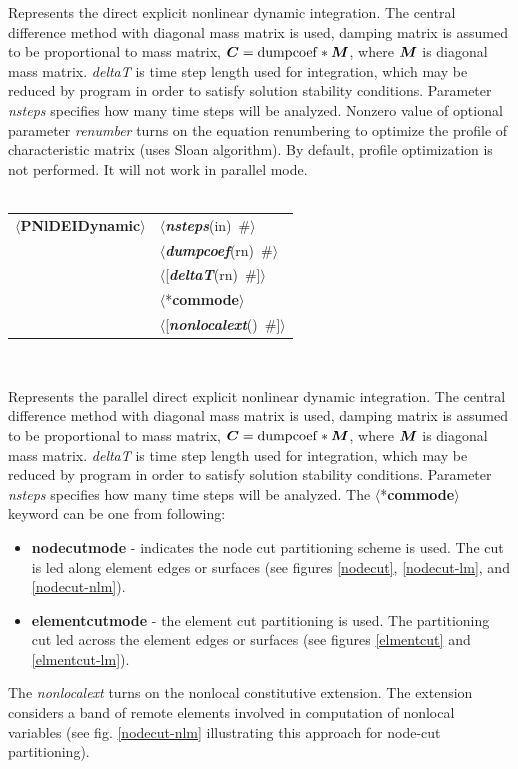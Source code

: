 \documentclass[a4paper]{article}
\makeatletter
\newcommand{\mbf}[1]{\mbox{\boldmath$#1$}}
\newcommand{\param}[1]{{\em #1}}
\newcommand{\keywordnotype}[1]{\mbox{{\it{\bf{#1}}}}}
\newcommand{\keyword}[2]{\mbox{{\keywordnotype{#1}\tiny (#2)}}}
\newcommand{\entKeywordInst}[1]{\mbox{{\bf{{#1}}}}}
\newcommand{\field}[2]{\mbox{\keyword{#1}{#2}~\#}}
\newcommand{\Pmode}[1]{{\sffamily #1}}
\newcommand{\PentKeyword}[1]{\mbox{{$\langle$*{\bf{#1}}$\rangle$}}}
\newcommand{\PentKeywordInst}[1]{\mbox{$\langle${\bf{{#1}}}$\rangle$}}
\newcommand{\Pfield}[2]{\mbox{$\langle$\keyword{#1}{#2}~\#$\rangle$}}
\newcommand{\PoptField}[2]{\mbox{$\langle$[\field{#1}{#2}]$\rangle$}}
\newenvironment{record}[1][]{\begin{tabular}{|ll}}{\end{tabular}\\}
\newcommand{\recentry}[2]{{#1}&{#2}\\}
\newcounter{rcc}
\newenvironment{record}[1][\textwidth]{\setcounter{rcc}{0}\begin{tabular*}{#1}{|ll@{\extracolsep{\fill}}r}}{\end{tabular*}\\}
\newcommand{\recentry}[2]{\ifthenelse{\value{rcc}>0}{&$\backslash$ \\}{\setcounter{rcc}{1}}{#1}&{#2}}
\makeatother
\begin{document}
Represents the direct explicit  nonlinear dynamic  integration.
The central difference method with diagonal mass matrix is used,
damping matrix is assumed to be proportional to mass matrix, $\mbf{C}
= {\rm dumpcoef} * \mbf{M}$, where
$\mbf{M}$ is diagonal mass matrix. \param{deltaT} is time step length used for
integration, which may be reduced by program in order to satisfy
solution stability conditions. Parameter \param{nsteps} specifies
how many time steps will be analyzed.
Nonzero value of optional parameter \param{renumber} turns on the
equation renumbering to optimize the profile of characteristic matrix
(uses Sloan algorithm). By default, profile optimization is not
performed. It will not work in parallel mode.
\\ \\
\noindent
\begin{record}
\recentry{\PentKeywordInst{PNlDEIDynamic}}{\Pfield{nsteps}{in}}
\recentry{}{\Pfield{dumpcoef}{rn}} \recentry{}{\PoptField{deltaT}{rn}}
\recentry{}{\PentKeyword{commode}} \recentry{}{\PoptField{nonlocalext}{}}
\end{record}

\Pmode{
Represents the parallel direct explicit  nonlinear dynamic  integration.
The central difference method with diagonal mass matrix is used,
damping matrix is assumed to be proportional to mass matrix, $\mbf{C}
= {\rm dumpcoef} * \mbf{M}$, where
$\mbf{M}$ is diagonal mass matrix. \param{deltaT} is time step length used for
integration, which may be reduced by program in order to satisfy
solution stability conditions. Parameter \param{nsteps} specifies
how many time steps will be analyzed.
The \PentKeyword{commode} keyword can be one from following:
\begin{itemize}
\item \entKeywordInst{nodecutmode} - indicates the node cut partitioning scheme is
used. The cut is led along element edges or surfaces (see
figures \ref{nodecut}, \ref{nodecut-lm}, and \ref{nodecut-nlm}).
\item \entKeywordInst{elementcutmode} - the element cut partitioning is used. The
partitioning cut led across the element edges or surfaces (see 
figures \ref{elmentcut} and \ref{elmentcut-lm}).
\end{itemize}
\Pmode{
The \param{nonlocalext} turns on the nonlocal constitutive
extension. The extension considers a band of remote elements involved
in computation of nonlocal variables (see fig. \ref{nodecut-nlm} illustrating
this approach for node-cut partitioning).
}
}
\end{document}
